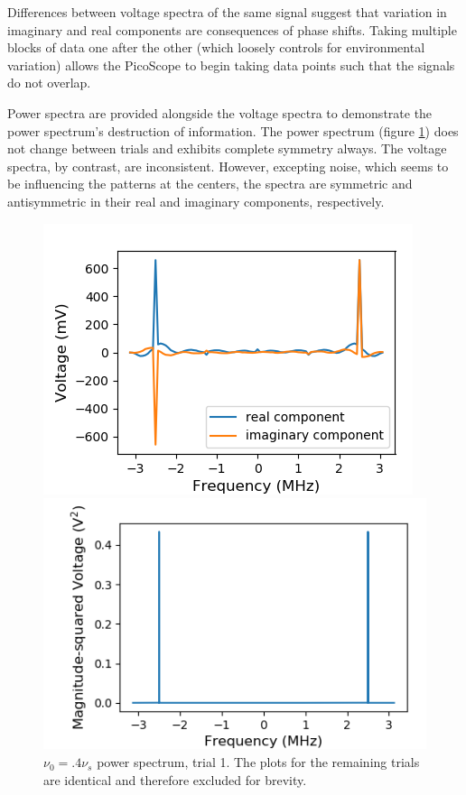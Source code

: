 \documentclass[a4paper]{article}
\begin{document}
Differences between voltage spectra of the same signal suggest that variation in imaginary and real components are consequences of phase shifts. Taking multiple blocks of data one after the other (which loosely controls for environmental variation) allows the PicoScope to begin taking data points such that the signals do not overlap.

Power spectra are provided alongside the voltage spectra to demonstrate the power spectrum's destruction of information. The power spectrum (figure \ref{fig:SyPw1}) does not change between trials and exhibits complete symmetry always. The voltage spectra, by contrast, are inconsistent. However, excepting noise, which seems to be influencing the patterns at the centers, the spectra are symmetric and antisymmetric in their real and imaginary components, respectively.


\begin{figure}
\centering
\begin{minipage}{.5\textwidth}
	\centering
	\includegraphics[width=.8\linewidth]{5-3/volt1}
	\caption{$\nu_0 = .4\nu_s = 2.5$ MHz \hfill \break voltage spectrum, trial 1.}
	\label{fig:Volt1}
\end{minipage}%
\begin{minipage}{.5\textwidth}
	\centering
	\includegraphics[width=.8\linewidth]{5-3/pow1}
	\caption{$\nu_0 = .4\nu_s$ power spectrum, trial 1. \hfill \break The plots for the remaining trials are identical \hfill \break and therefore excluded for brevity.}
	\label{fig:SyPw1}
\end{minipage}
\end{figure}
\end{document}
